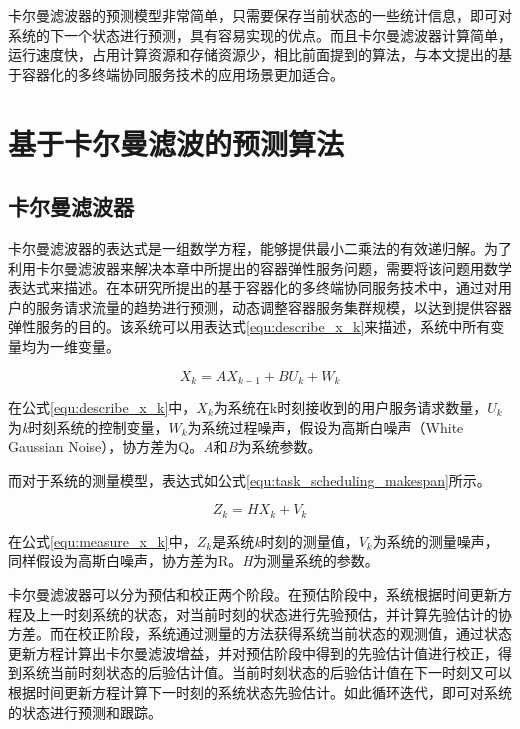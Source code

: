 卡尔曼滤波器的预测模型非常简单，只需要保存当前状态的一些统计信息，即可对系统的下一个状态进行预测，具有容易实现的优点。而且卡尔曼滤波器计算简单，运行速度快，占用计算资源和存储资源少，相比前面提到的算法，与本文提出的基于容器化的多终端协同服务技术的应用场景更加适合。

\section{基于卡尔曼滤波的预测算法}\label{sec:elastic_service_Kalman_filtering}
\subsection{卡尔曼滤波器}

卡尔曼滤波器的表达式是一组数学方程，能够提供最小二乘法的有效递归解\cite{welch1995introduction}。为了利用卡尔曼滤波器来解决本章中所提出的容器弹性服务问题，需要将该问题用数学表达式来描述。在本研究所提出的基于容器化的多终端协同服务技术中，通过对用户的服务请求流量的趋势进行预测，动态调整容器服务集群规模，以达到提供容器弹性服务的目的。该系统可以用表达式\ref{equ:describe_x_k}来描述，系统中所有变量均为一维变量。

\begin{equation}\label{equ:describe_x_k}
    X_k=AX_{k-1}+BU_{k}+W_{k}
\end{equation}

在公式\ref{equ:describe_x_k}中，$X_k$为系统在k时刻接收到的用户服务请求数量，$U_{k}$为\emph{k}时刻系统的控制变量，$W_k$为系统过程噪声，假设为高斯白噪声（White Gaussian Noise），协方差为Q。\emph{A}和\emph{B}为系统参数。

而对于系统的测量模型，表达式如公式\ref{equ:task_scheduling_makespan}所示。

\begin{equation}\label{equ:measure_x_k}
    Z_k=HX_{k}+V_{k}
\end{equation}

在公式\ref{equ:measure_x_k}中，$Z_k$是系统\emph{k}时刻的测量值，$V_k$为系统的测量噪声，同样假设为高斯白噪声，协方差为R。\emph{H}为测量系统的参数。

卡尔曼滤波器可以分为预估和校正两个阶段\cite{彭丁聪2009卡尔曼滤波的基本原理及应用}。在预估阶段中，系统根据时间更新方程及上一时刻系统的状态，对当前时刻的状态进行先验预估，并计算先验估计的协方差。而在校正阶段，系统通过测量的方法获得系统当前状态的观测值，通过状态更新方程计算出卡尔曼滤波增益，并对预估阶段中得到的先验估计值进行校正，得到系统当前时刻状态的后验估计值。当前时刻状态的后验估计值在下一时刻又可以根据时间更新方程计算下一时刻的系统状态先验估计。如此循环迭代，即可对系统的状态进行预测和跟踪。

